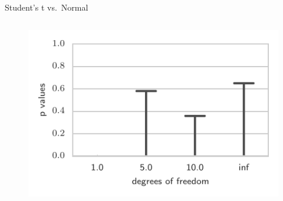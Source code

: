 \documentclass{beamer}
\begin{document}
  \begin{frame}{Student's t vs.~Normal}
\begin{columns}
        \begin{column}{.5\textwidth}
        \begin{figure}
           \includegraphics[width=\textwidth]{img/sgld_student_bad} 
           

\end{figure}
\end{column}
\end{columns}
\end{frame}
\end{document}
